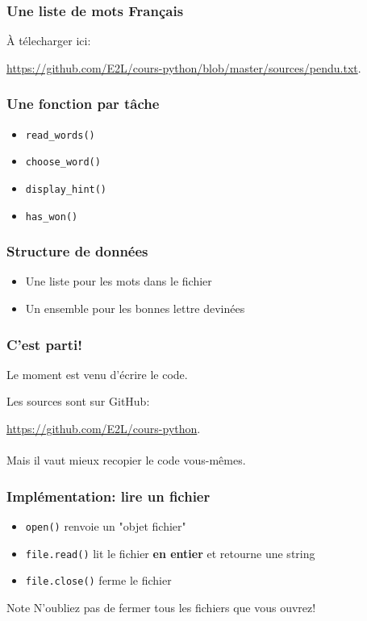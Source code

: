 \documentclass{beamer}
\begin{document}
\begin{frame}[fragile]
  \frametitle{Une liste de mots Français}

À télecharger ici:

\url{https://github.com/E2L/cours-python/blob/master/sources/pendu.txt}.

\end{frame}



\begin{frame}[fragile]
  \frametitle{Une fonction par tâche}

\begin{itemize}
  \item \texttt{read\_words()}
  \item \texttt{choose\_word()}
  \item \texttt{display\_hint()}
  \item \texttt{has\_won()}
\end{itemize}

\end{frame}

\begin{frame}[fragile]
  \frametitle{Structure de données}
\begin{itemize}
  \item Une liste pour les mots dans le fichier
  \item Un ensemble pour les bonnes lettre devinées
\end{itemize}
\end{frame}


\begin{frame}[fragile]
  \frametitle{C'est parti!}

Le moment est venu d'écrire le code.

Les sources sont sur GitHub:

\url{https://github.com/E2L/cours-python}. \\~\\

Mais il vaut mieux recopier le code vous-mêmes.

\end{frame}


\begin{frame}[fragile]
  \frametitle{Implémentation: lire un fichier}

\begin{itemize}
  \item \texttt{open()} renvoie un "objet fichier"
  \item \texttt{file.read()} lit le fichier \textbf{en entier} et retourne une string
  \item \texttt{file.close()} ferme le fichier
\end{itemize}

\begin{alertblock}{Note}
  N'oubliez pas de fermer tous les fichiers que vous ouvrez!
\end{alertblock}
\end{frame}
\end{document}

